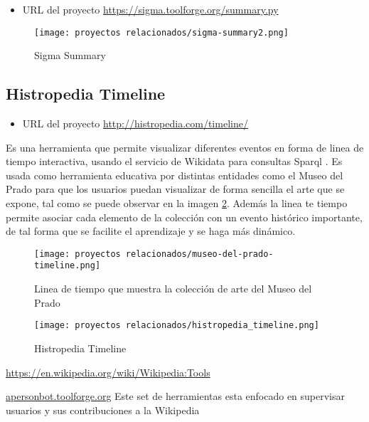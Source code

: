 \begin{itemize}
    \item URL del proyecto \url{https://sigma.toolforge.org/summary.py}
\end{itemize}

\begin{figure}[H]
    \centering
    \texttt{[image: proyectos relacionados/sigma-summary2.png]}
    \caption{Sigma Summary}
    \label{sigma_summary}
\end{figure}

\subsection{Histropedia Timeline}

\begin{itemize}
    \item URL del proyecto \url{http://histropedia.com/timeline/}
\end{itemize}

Es una herramienta que permite visualizar diferentes eventos en forma de linea de tiempo interactiva, usando el servicio de Wikidata para consultas Sparql \cite{WikidataSparql}. Es usada como herramienta educativa por distintas entidades como el Museo del Prado para que los usuarios puedan visualizar de forma sencilla el arte que se expone, tal como se puede observar en la imagen \ref{fig:museo-de-prado-timeline}. Además la linea te tiempo permite asociar cada elemento de la colección con un evento histórico importante, de tal forma que se facilite el aprendizaje y se haga más dinámico.

\begin{figure}[H]
    \centering
    \texttt{[image: proyectos relacionados/museo-del-prado-timeline.png]}
    \caption{Linea de tiempo que muestra la colección de arte del Museo del Prado}
    \label{fig:museo-de-prado-timeline}
\end{figure}



\begin{figure}[H]
    \centering
    \texttt{[image: proyectos relacionados/histropedia\_timeline.png]}
    \caption{Histropedia Timeline}
    \label{histropedia_timeline}
\end{figure}


\url{https://en.wikipedia.org/wiki/Wikipedia:Tools}

\url{apersonbot.toolforge.org}
Este set de herramientas esta enfocado en supervisar usuarios y sus contribuciones a la Wikipedia

